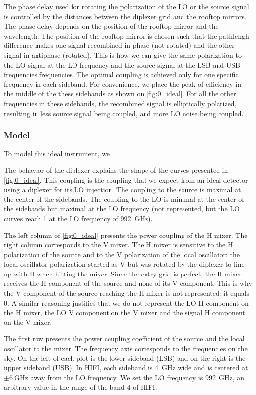 The phase delay used for rotating the polarization of the LO or the source signal is controlled by the distances between the diplexer grid and the rooftop mirrors.
The phase delay depends on the position of the rooftop mirror and the wavelength.
The position of the rooftop mirror is chosen such that the pathlengh difference makes one signal recombined in phase (not rotated) and the other signal in antiphase (rotated).
This is how we can give the same polarization to the LO signal at the LO frequency and the source signal at the LSB and USB frequencies frequencies.
The optimal coupling is achieved only for one specific frequency in each sideband.
For convenience, we place the peak of efficiency in the middle of the these sidebands as shown on \cref{fig:0_ideal}.
For all the other frequencies in these sidebands, the recombined signal is elliptically polarized, resulting in less source signal being coupled, and more LO noise being coupled.

\subsubsection{Model}

To model this ideal instrument, we 

The behavior of the diplexer explains the shape of the curves presented in \cref{fig:0_ideal}.
This coupling is the coupling that we expect from an ideal detector using a diplexer for its LO injection.
The coupling to the source is maximal at the center of the sidebands.
The coupling to the LO is minimal at the center of the sidebands but maximal at the LO frequency (not represented, but the LO curves reach 1 at the LO frequency of \SI{992}{\giga\hertz}).

The left column of \cref{fig:0_ideal} presents the power coupling of the H mixer.
The right column corresponds to the V mixer.
The H mixer is sensitive to the H polarization of the source and to the V polarization of the local oscillator: the local oscillator polarization started as V but was rotated by the diplexer to line up with H when hitting the mixer.
Since the entry grid is perfect, the H mixer receives the H component of the source and none of its V component.
This is why the V component of the source reaching the H mixer is not represented: it equals 0.
A similar reasoning justifies that we do not represent the LO H component on the H mixer, the LO V component on the V mixer and the signal H component on the V mixer.

The first row presents the power coupling coefficient of the source and the local oscillator to the mixer.
The frequency axis corresponds to the frequencies on the sky.
On the left of each plot is the lower sideband (LSB) and on the right is the upper sideband (USB).
In HIFI, each sideband is \SI{4}{\giga\hertz} wide and is centered at $\pm \SI{6}{\giga\hertz}$ away from the LO frequency.
We set the LO frequency is \SI{992}{\giga\hertz}, an arbitrary value in the range of the band 4 of HIFI.

